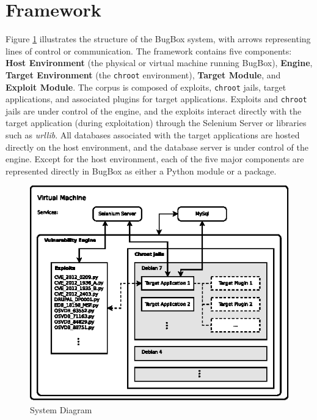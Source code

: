 \documentclass[letterpaper,twocolumn,10pt]{article}
\begin{document}
\section{Framework}

Figure \ref{fig:diagram} illustrates the structure of the BugBox system, with arrows representing lines of control or communication. The framework contains five components: {\bf Host Environment} (the physical or virtual machine running BugBox), {\bf Engine}, {\bf Target Environment} (the \texttt{chroot} environment), {\bf Target Module}, and {\bf Exploit Module}. The corpus is composed of exploits, {\tt chroot} jails, target applications, and associated plugins for target applications. Exploits and {\tt chroot} jails are under control of the engine, and the exploits interact directly with the target application (during exploitation) through the Selenium Server or libraries such as \emph{urllib}. All databases associated with the target applications are hosted directly on the host environment, and the database server is under control of the  engine.
Except for the host environment, each of the five major components are represented directly in BugBox as either a Python module or a package.

\begin{figure}[!tp]
\label{fig:diagram}
\begin{center}
\includegraphics[scale=1.17]{system_diagram.eps}
\end{center}
\caption{System Diagram}
\end{figure}
\end{document}
